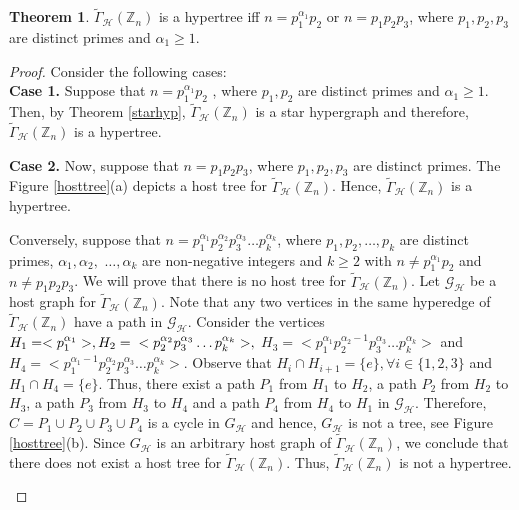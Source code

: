\documentclass[11pt,a4paper]{article}
\theoremstyle{definition}
\newtheorem{theorem}{Theorem}[section]
\theoremstyle{remark}
\begin{document}
	\begin{theorem}
		$\tilde{\Gamma}_\mathcal{H}(\mathbb{Z}_n)$ is a hypertree iff $n=p_1^{\alpha_1} p_2$ or $n=p_1p_2p_3$, where $p_1,p_2,p_3$ are distinct primes and $\alpha_1 \geq 1$.
	\end{theorem}
	\begin{proof} Consider the following cases:\\
		\textbf{Case 1.} Suppose that $n=p_1^{\alpha_1} p_2$ , where $p_1,p_2$ are distinct primes and $\alpha_1 \geq 1$. Then, by Theorem \ref{starhyp}, $\tilde{\Gamma}_\mathcal{H}(\mathbb{Z}_n)$ is a star hypergraph and therefore, $\tilde{\Gamma}_\mathcal{H}(\mathbb{Z}_n)$ is a hypertree.
		
	
		\noindent\textbf{Case 2.} Now, suppose that $n=p_1p_2p_3$,  where $p_1,p_2,p_3$ are distinct primes. The Figure \ref{hosttree}(a) depicts a host tree for $\tilde{\Gamma}_\mathcal{H}(\mathbb{Z}_n)$. Hence, $\tilde{\Gamma}_\mathcal{H}(\mathbb{Z}_n)$ is a hypertree.
	
		
		\noindent Conversely, suppose that  $n=p_1^{\alpha_1}p_2^{\alpha_2}p_3^{\alpha_3}\ldots p_k^{\alpha_k}$, where $p_1,p_2, \ldots, p_k$ are distinct primes, $\alpha_1, \alpha_2,$ $ \ldots, \alpha_k$ are non-negative integers and $k\geq 2$ with $n \neq p_1^{\alpha_1}p_2$ and  $n \neq p_1 p_2 p_3$. We will prove that there is no host tree for $\tilde{\Gamma}_\mathcal{H}(\mathbb{Z}_n)$. Let $\mathcal{G}_\mathcal{H}$ be a host graph for $\tilde{\Gamma}_\mathcal{H}(\mathbb{Z}_n)$. Note that any two vertices in the same hyperedge of  $\tilde{\Gamma}_\mathcal{H}(\mathbb{Z}_n)$ have a path  in $\mathcal{G}_\mathcal{H}$.  Consider the vertices $H_1=<p_1^{\alpha_1}>, H_2= \\<p_2^{\alpha_2}p_3^{\alpha_3}\ldots p_k^{\alpha_k}>,$ $ H_3=<p_1^{\alpha_1}p_2^{\alpha_2 -1}p_3^{\alpha_3}\ldots p_k^{\alpha_k}>$ and $H_4=<p_1^{\alpha_1 -1} p_2^{\alpha_2}p_3^{\alpha_3}\ldots p_k^{\alpha_k}>$. Observe that $H_{i} \cap H_{i+1} =\{e\}, \forall i \in \{1,2,3\}$ and $H_1 \cap H_4=\{e\}$. Thus, there exist a path $P_1$ from $H_1$ to $H_2$, a path  $P_2$  from $H_2$ to $H_3$, a path $P_3$ from $H_3$ to $H_4$ and a path $P_4$ from $H_4$ to $H_1$ in $\mathcal{G}_\mathcal{H}$. Therefore, $C=P_1 \cup P_2 \cup P_3 \cup P_4$ is a cycle in $G_\mathcal{H}$  and hence,  $G_\mathcal{H}$ is not a tree, see Figure \ref{hosttree}(b). Since $G_\mathcal{H}$ is an arbitrary host graph of $\tilde{\Gamma}_\mathcal{H}(\mathbb{Z}_n)$, we conclude that there does not exist a host tree for  $\tilde{\Gamma}_\mathcal{H}(\mathbb{Z}_n)$. Thus, $\tilde{\Gamma}_\mathcal{H}(\mathbb{Z}_n)$ is not a hypertree.
			\begin{figure}[h]
			\centering
			

\end{figure}
\end{proof}
\end{document}
